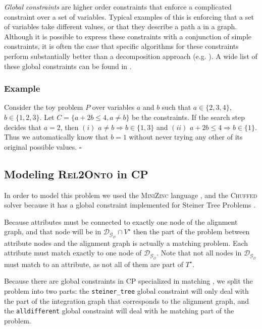 \documentclass[letterpaper]{article} %
\newcommand{\minizinc}{\textsc{MiniZinc}}
\newcommand{\chuffed}{\textsc{Chuffed}}
\newcommand{\relonto}{\textsc{Rel2Onto}}
\begin{document}
\emph{Global constraints} are higher order constraints that enforce a 
complicated 
constraint over a set of variables. Typical examples of this is enforcing that 
a set of variables take different values, or that they describe a path a in a 
graph. Although it is possible to express these constraints with a conjunction 
of simple constraints, it is often the case that specific algorithms for these 
constraints perform substantially better than a decomposition approach (e.g. 
\cite{regin1994filtering}). A wide 
list of these global constraints can be found in \cite{beldiceanu2012global}.

\subsubsection{Example} Consider the toy problem $P$ over variables $a$ and $b$ 
such that $a \in \{2,3,4\}$, $b \in \{1,2,3\}$. Let $C = \{a + 2b \leq 4, a 
\neq b\}$ be the constraints. If the search step decides that $a = 
2$, then $(i)$ $a \neq b \Rightarrow b \in \{1,3\}$ and $(ii)$ $a + 2b \leq 4  
\Rightarrow b \in \{1\}$. Thus we automatically know that $b = 1$ without never 
trying any other of its original possible values. $\square$


\subsection{Modeling \relonto{} in CP}
In order to model this problem we used the \minizinc{} language 
\cite{minizinc}, and the 
\chuffed{} solver \cite{chu2011improving} because it has a global constraint 
implemented for Steiner 
Tree Problems \cite{deuna2016steiner}. 

Because attributes must be connected to exactly one node of the alignment 
graph, and that node will be in $\mathcal{D_{G_O}} \cap V^\star$ 
then the part of the problem between attribute nodes and the alignment graph is 
actually a matching problem. Each attribute must match exactly to one node of 
$\mathcal{D_{G_O}}$. Note that not all nodes in $\mathcal{D_{G_O}}$ must match 
to an attribute, as not all of them are part of $T^\star$.

Because there are global constraints in CP specialized in matching 
\cite{regin1994filtering}, we split the problem into two parts: the 
\verb|steiner_tree| global constraint will only deal with the part of the 
integration graph that corresponds to the alignment graph, and the 
\verb|alldifferent| global constraint will deal with he matching part of the 
problem.
\end{document}
